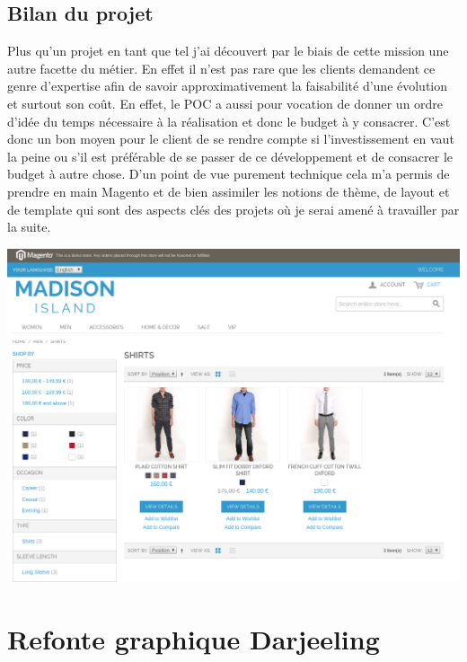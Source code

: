 \documentclass[a4paper,11pt,twoside]{report}
\begin{document}
    \subsection*{Bilan du projet}
    Plus qu'un projet en tant que tel j'ai découvert par le biais de cette mission une autre facette du métier. En effet il n'est pas rare que les clients demandent ce genre d'expertise afin de savoir approximativement la faisabilité d'une évolution et surtout son coût. En effet, le POC a aussi pour vocation de donner un ordre d'idée du temps nécessaire à la réalisation et donc le budget à y consacrer. C'est donc un bon moyen pour le client de se rendre compte si l'investissement en vaut la peine ou s'il est préférable de se passer de ce développement et de consacrer le budget à autre chose. D'un point de vue purement technique cela m'a permis de prendre en main Magento et de bien assimiler les notions de thème, de layout et de template qui sont des aspects clés des projets où je serai amené à travailler par la suite. 
    \begin{center}
      \includegraphics[width=\textwidth]{images/new_responsive_magento_theme.png} 
      \label{responsive_theme_magento}
    \end{center}

    \newpage
    
  \section{Refonte graphique Darjeeling}
\end{document}
